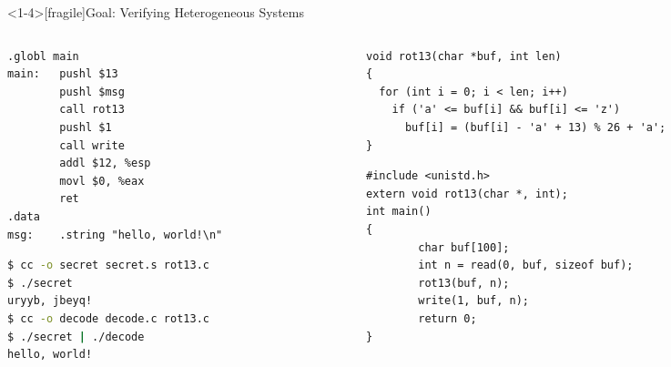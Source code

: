 \documentclass[aspectratio=1610,mathserif]{beamer}
\begin{document}
\begin{frame}<1-4>[fragile]{Goal: Verifying Heterogeneous Systems} %
  \pause
  \begin{columns}
  \begin{column}{.41\textwidth}
  \begin{lstlisting}[title={secret.s}]
.globl main
main:   pushl $13
        pushl $msg
        call rot13
        pushl $1
        call write
        addl $12, %esp
        movl $0, %eax
        ret
.data
msg:    .string "hello, world!\n"
  \end{lstlisting}
  \vspace{1em}
  \begin{lstlisting}[language=sh]
$ cc -o secret secret.s rot13.c
$ ./secret
uryyb, jbeyq!
$ cc -o decode decode.c rot13.c
$ ./secret | ./decode
hello, world!
  \end{lstlisting}
  \end{column}
  \begin{column}{.595\textwidth}
  \begin{lstlisting}[title={rot13.c}]
void rot13(char *buf, int len)
{
  for (int i = 0; i < len; i++)
    if ('a' <= buf[i] && buf[i] <= 'z')
      buf[i] = (buf[i] - 'a' + 13) % 26 + 'a';
}
  \end{lstlisting}
  \begin{lstlisting}[title={decode.c}]
#include <unistd.h>
extern void rot13(char *, int);
int main()
{
        char buf[100];
        int n = read(0, buf, sizeof buf);
        rot13(buf, n);
        write(1, buf, n);
        return 0;
}
  \end{lstlisting}
  \end{column}
  \end{columns}
\end{frame}
\end{document}
